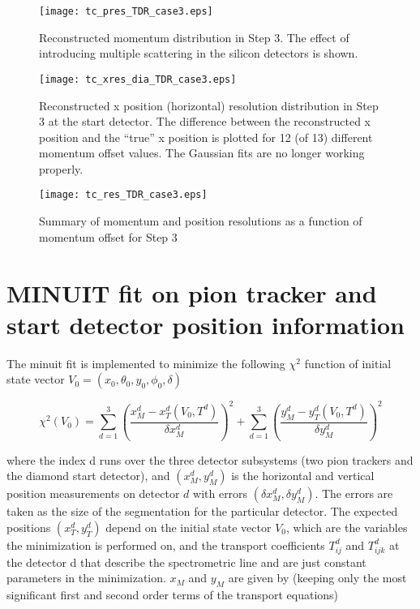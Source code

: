 \documentclass[20]{article}
\begin{document}
\begin{figure}[tbp]
  \texttt{[image: tc\_pres\_TDR\_case3.eps]}
  \caption{Reconstructed momentum distribution in Step 3. The effect
    of introducing multiple scattering in the silicon detectors is
    shown. }
  \label {step3:pres}
\end{figure}

\begin{figure}[tbp]
  \texttt{[image: tc\_xres\_dia\_TDR\_case3.eps]}
  \caption{Reconstructed x position (horizontal) resolution
    distribution in Step 3 at the start detector. The difference
    between the reconstructed x position and the ``true'' x position
    is plotted for 12 (of 13) different momentum offset values. The
    Gaussian fits are no longer working properly.}
  \label {step3:xres}
\end{figure}

\begin{figure}[tbp]
  \texttt{[image: tc\_res\_TDR\_case3.eps]}
  \caption{Summary of momentum and position resolutions as a function
    of momentum offset for Step 3}
  \label {step3:res}
\end{figure}

\section{MINUIT fit on pion tracker and start detector position information}

The minuit fit is implemented to minimize the following $\chi^2$ function of initial state vector $V_0=(x_0,\theta_0,y_0,\phi_0,\delta)$

\begin{equation}
  \chi^2(V_0) = \sum^{3}_{d=1} \left( \frac{x^{d}_{M} - x^{d}_{T}(V_0, T^d)}{\delta x^{d}_{M}} \right)^2 + \sum^{3}_{d=1} \left( \frac{y^{d}_{M} - y^{d}_{T}(V_0, T^d)}{\delta y^{d}_{M}} \right)^2 
\end{equation}

where the index d runs over the three detector subsystems (two pion
trackers and the diamond start detector), and $(x^{d}_{M}, y^{d}_{M})$
is the horizontal and vertical position measurements on detector $d$
with errors $(\delta x^{d}_{M}, \delta y^{d}_{M})$. The errors are
taken as the size of the segmentation for the particular detector. The
expected positions $(x^{d}_{T}, y^{d}_{T})$ depend on the initial
state vector $V_0$, which are the variables the minimization is
performed on, and the transport coefficients $T^{d}_{ij}$ and
$T^{d}_{ijk}$ at the detector d that describe the spectrometric line
and are just constant parameters in the minimization. $x_{M}$ and
$y_{M}$ are given by (keeping only the most significant first and
second order terms of the transport equations)
\end{document}
